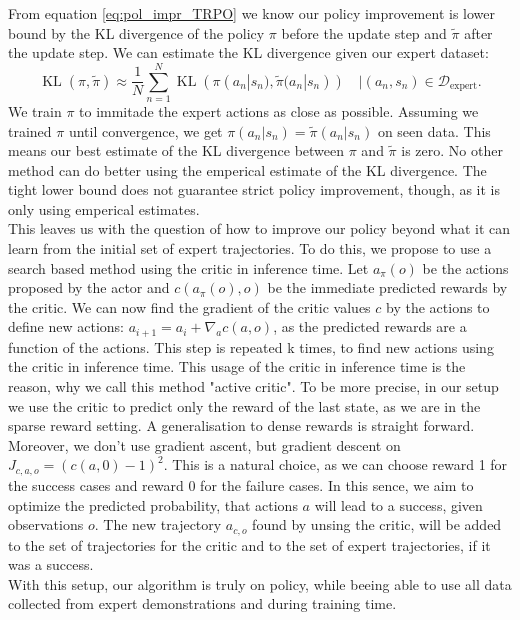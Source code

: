 From equation \ref{eq:pol_impr_TRPO} we know our policy improvement is lower bound by the KL divergence of the policy $\pi$ before the update step and 
$\tilde{\pi}$ after the update step. We can estimate the KL divergence given our expert dataset:
\begin{equation*}  
    {\operatorname{KL}} (\pi,\tilde{\pi}) \approx \frac{1}{N} \sum_{n=1}^N {\operatorname{KL}} (\pi(a_n|s_n),\tilde{\pi}(a_n|s_n)) \quad |(a_n,s_n) \in \mathcal{D}_{\text{expert}}.
\end{equation*}  
We train $\pi$ to immitade the expert actions as close as possible. Assuming we trained $\pi$ until convergence, we get $\pi(a_n|s_n) = \tilde{\pi}(a_n|s_n)$ on seen 
data. This means our best estimate of the KL divergence between $\pi$ and $\tilde{\pi}$ is zero. No other method can do better using the emperical 
estimate of the KL divergence. The tight lower bound does not guarantee strict policy improvement, though, as it is only using emperical estimates.
\\
This leaves us with the question of how to improve our policy beyond what it can learn from the initial set of expert trajectories. To do this, we propose to use 
a search based method using the critic in inference time. Let $a_{\pi}(o)$ be the actions proposed by the actor and $c(a_{\pi}(o), o)$ be the immediate predicted rewards by the critic. 
We can now find the gradient of the critic values $c$ by the actions to define new actions: $a_{i+1} = a_i + \nabla_{a}c(a, o)$, as the predicted rewards are a 
function of the actions. This step is repeated k times, to find new actions using the critic in inference time. This usage of the critic in inference time 
is the reason, why we call this method "active critic". To be more precise, in our setup we use the critic to predict only the reward of the last state, as we are 
in the sparse reward setting. A generalisation to dense rewards is straight forward. Moreover, we don't use gradient ascent, but gradient descent on 
$J_{c, a, o} = (c(a, 0) - 1)^2$. This is a natural choice, as we can 
choose reward 1 for the success cases and reward 0 for the failure cases. In this sence, we aim to optimize the predicted probability, that actions $a$ will lead 
to a success, given observations $o$. The new trajectory $a_{c, o}$ found by unsing the critic, will 
be added to the set of trajectories for the critic and to the set of expert trajectories, if it was a success. \\
With this setup, our algorithm is truly on policy, while beeing able to use all data collected from expert demonstrations and during training time. 


